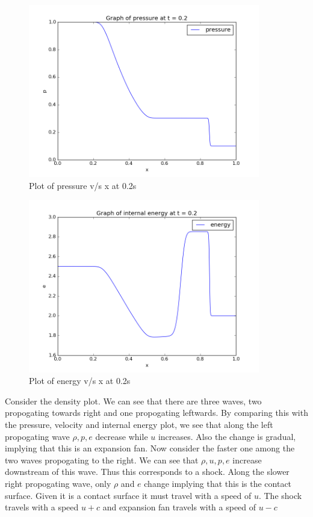 \documentclass[11pt, a4paper]{article}
\begin{document}
\begin{figure}[H]
 \centering
 \includegraphics[width = 0.9\textwidth]{Sh_tube_p.png}
 \caption{Plot of pressure v/s x at 0.2s}
\end{figure}

\begin{figure}[H]
 \centering
 \includegraphics[width = 0.9\textwidth]{Sh_tube_en.png}
 \caption{Plot of energy v/s x at 0.2s}
\end{figure}

Consider the density plot. We can see that there are three waves, two propogating towards right and one propogating leftwards.
By comparing this with the pressure, velocity and internal energy plot, we see that along the left propogating wave $\rho, 
p, e$ decrease while $u$ increases. Also the change is gradual, implying that this is an expansion fan. Now consider the faster
one among the two waves propogating to the right. We can see that $\rho, u, p, e$ increase downstream of this wave. Thus this 
corresponds to a shock. Along the slower right propogating wave, only $\rho$ and $e$ change implying that this is the contact
surface. Given it is a contact surface it must travel with a speed of $u$. The shock travels with a speed $u + c$ and expansion
fan travels with a speed of $u-c$
\end{document}
